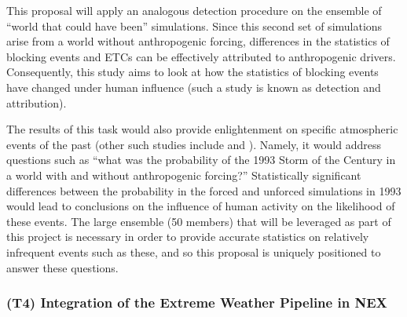 \documentclass[11pt]{article}
\begin{document}
This proposal will apply an analogous detection procedure on the ensemble of ``world that could have been'' simulations.  Since this second set of simulations arise from a world without anthropogenic forcing, differences in the statistics of blocking events and ETCs can be effectively attributed to anthropogenic drivers.  Consequently, this study aims to look at how the statistics of blocking events have changed under human influence (such a study is known as detection and attribution).

The results of this task would also provide enlightenment on specific atmospheric events of the past (other such studies include \cite{stott2004human} and \cite{pall2011anthropogenic}).  Namely, it would address questions such as ``what was the probability of the 1993 Storm of the Century in a world with and without anthropogenic forcing?''  Statistically significant differences between the probability in the forced and unforced simulations in 1993 would lead to conclusions on the influence of human activity on the likelihood of these events.  The large ensemble (50 members) that will be leveraged as part of this project is necessary in order to provide accurate statistics on relatively infrequent events such as these, and so this proposal is uniquely positioned to answer these questions.



\subsubsection{(T4) Integration of the Extreme Weather Pipeline in NEX}
\end{document}
